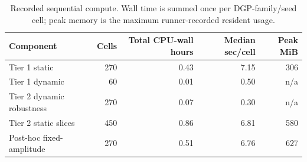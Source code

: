 \begin{table}[H]\centering\small
\caption{Recorded sequential compute. Wall time is summed once per DGP-family/seed cell; peak memory is the maximum runner-recorded resident usage.}
\begin{tabular}{lrrrr}\toprule
Component & Cells & Total CPU-wall hours & Median sec/cell & Peak MiB\\\midrule
Tier 1 static & 270 & 0.43 & 7.15 & 306 \\
Tier 1 dynamic & 60 & 0.01 & 0.50 & n/a \\
Tier 2 dynamic robustness & 270 & 0.07 & 0.30 & n/a \\
Tier 2 static slices & 450 & 0.86 & 6.81 & 580 \\
Post-hoc fixed-amplitude & 270 & 0.51 & 6.76 & 627 \\
\bottomrule\end{tabular}\end{table}
